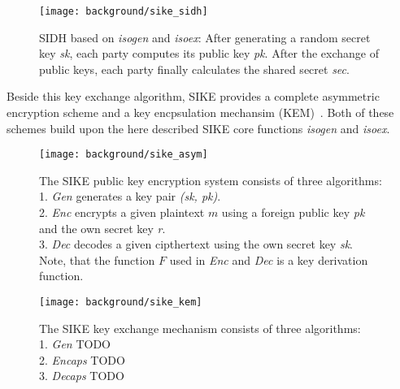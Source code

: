 \begin{figure}[H]
  \centering
  \texttt{[image: background/sike\_sidh]}
  \caption[SIDH based on \textit{isogen} and \textit{isoex}]{SIDH based on \textit{isogen} and \textit{isoex}: After generating a random secret key \textit{sk}, each party computes its public key \textit{pk}. After the exchange of public keys, each party finally calculates the shared secret \textit{sec}.} \label{fig:sike-sidh}
\end{figure}
Beside this key exchange algorithm, SIKE provides a complete asymmetric encryption scheme and a key encpsulation mechansim (KEM)~\parencite{sike2020spec}. 
Both of these schemes build upon the here described SIKE core functions \textit{isogen} and \textit{isoex}.

\begin{figure}[H]
  \centering
  \texttt{[image: background/sike\_asym]}
  \caption[SIKE public key encryption]
  {The SIKE public key encryption system consists of three algorithms: 
  \\
  1. \textit{Gen} generates a key pair \textit{(sk, pk)}.
  \\
  2. \textit{Enc} encrypts a given plaintext $m$ using a foreign public key \textit{pk} and the own secret key \textit{r}.
  \\
  3. \textit{Dec} decodes a given cipthertext using the own secret key \textit{sk}.
  \\ Note, that the function $F$ used in \textit{Enc} and \textit{Dec} is a key derivation function.} \label{fig:sike-sidh}
\end{figure}

\begin{figure}[H]
  \centering
  \texttt{[image: background/sike\_kem]}
  \caption[SIKE public key encryption]
  {The SIKE key exchange mechanism consists of three algorithms: 
  \\
  1. \textit{Gen} TODO
  \\
  2. \textit{Encaps} TODO
  \\
  3. \textit{Decaps} TODO
  } \label{fig:sike-sidh}
\end{figure}

